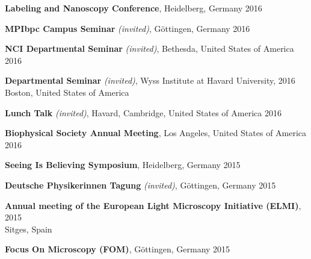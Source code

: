 \documentclass[margin,line]{res}
\begin{document}
\begin{resume}
\vspace*{-2.5mm}
{\bf Labeling and Nanoscopy Conference}, Heidelberg, Germany \hfill 2016%

\vspace*{-2.5mm}
{\bf MPIbpc Campus Seminar} {\it (invited)}, Göttingen, Germany \hfill 2016%

\vspace*{-2.5mm}
{\bf NCI Departmental Seminar} {\it (invited)}, Bethesda, United States of America \hfill 2016%

\vspace*{-2.5mm}
{\bf Departmental Seminar} {\it (invited)}, Wyss Institute at Havard University,  \hfill 2016\\
Boston, United States of America

\vspace*{-2.5mm}
{\bf Lunch Talk} {\it (invited)}, Havard, Cambridge, United States of America \hfill 2016%

\vspace*{-2.5mm}
{\bf Biophysical Society Annual Meeting}, Los Angeles, United States of America \hfill 2016%

\vspace*{-2.5mm}
{\bf Seeing Is Believing Symposium}, Heidelberg, Germany \hfill 2015%

\vspace*{-2.5mm}
{\bf Deutsche Physikerinnen Tagung} {\it (invited)}, Göttingen, Germany \hfill 2015%

\vspace*{-2.5mm}
{\bf Annual meeting of the European Light Microscopy Initiative (ELMI)},  \hfill 2015\\Sitges, Spain%

\vspace*{-2.5mm}
{\bf Focus On Microscopy (FOM)}, Göttingen, Germany  \hfill 2015%


\end{resume}
\end{document}
